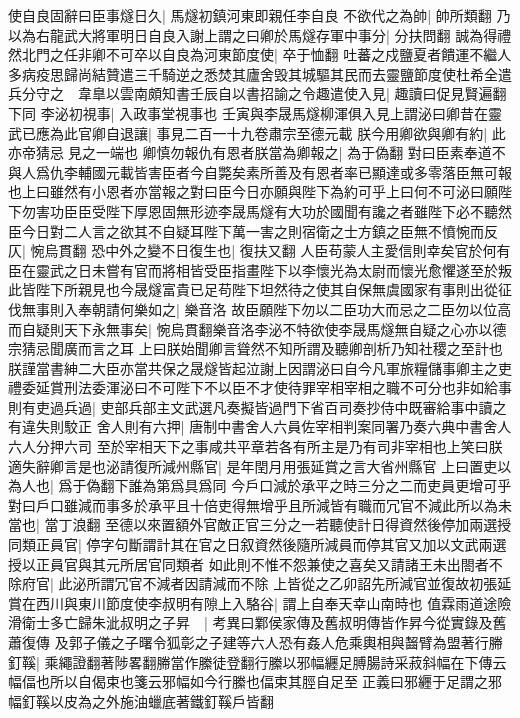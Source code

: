 使自良固辭曰臣事燧日久|{
	馬燧初鎮河東即親任李自良}
不欲代之為帥|{
	帥所類翻}
乃以為右龍武大將軍明日自良入謝上謂之曰卿於馬燧存軍中事分|{
	分扶問翻}
誠為得禮然北門之任非卿不可卒以自良為河東節度使|{
	卒于恤翻}
吐蕃之戍鹽夏者饋運不繼人多病疫思歸尚結贊遣三千騎逆之悉焚其廬舍毁其城驅其民而去靈鹽節度使杜希全遣兵分守之　韋臯以雲南頗知書壬辰自以書招諭之令趣遣使入見|{
	趣讀曰促見賢遍翻下同}
李泌初視事|{
	入政事堂視事也}
壬寅與李晟馬燧柳渾俱入見上謂泌曰卿昔在靈武已應為此官卿自退讓|{
	事見二百一十九卷肅宗至德元載}
朕今用卿欲與卿有約|{
	此亦帝猜忌見之一端也}
卿慎勿報仇有恩者朕當為卿報之|{
	為于偽翻}
對曰臣素奉道不與人爲仇李輔國元載皆害臣者今自斃矣素所善及有恩者率已顯達或多零落臣無可報也上曰雖然有小恩者亦當報之對曰臣今日亦願與陛下為約可乎上曰何不可泌曰願陛下勿害功臣臣受陛下厚恩固無形迹李晟馬燧有大功於國聞有讒之者雖陛下必不聽然臣今日對二人言之欲其不自疑耳陛下萬一害之則宿衛之士方鎮之臣無不憤惋而反仄|{
	惋烏貫翻}
恐中外之變不日復生也|{
	復扶又翻}
人臣苟蒙人主愛信則幸矣官於何有臣在靈武之日未嘗有官而將相皆受臣指畫陛下以李懷光為太尉而懷光愈懼遂至於叛此皆陛下所親見也今晟燧富貴已足苟陛下坦然待之使其自保無虞國家有事則出從征伐無事則入奉朝請何樂如之|{
	樂音洛}
故臣願陛下勿以二臣功大而忌之二臣勿以位高而自疑則天下永無事矣|{
	惋烏貫翻樂音洛李泌不特欲使李晟馬燧無自疑之心亦以德宗猜忌聞廣而言之耳}
上曰朕始聞卿言聳然不知所謂及聽卿剖析乃知社稷之至計也朕謹當書紳二大臣亦當共保之晟燧皆起泣謝上因謂泌曰自今凡軍旅糧儲事卿主之吏禮委延賞刑法委渾泌曰不可陛下不以臣不才使待罪宰相宰相之職不可分也非如給事則有吏過兵過|{
	吏部兵部主文武選凡奏擬皆過門下省百司奏抄侍中既審給事中讀之有違失則駮正}
舍人則有六押|{
	唐制中書舍人六員佐宰相判案同署乃奏六典中書舍人六人分押六司}
至於宰相天下之事咸共平章若各有所主是乃有司非宰相也上笑曰朕適失辭卿言是也泌請復所減州縣官|{
	是年閏月用張延賞之言大省州縣官}
上曰置吏以為人也|{
	爲于偽翻下誰為第爲具爲同}
今戶口減於承平之時三分之二而吏員更增可乎對曰戶口雖減而事多於承平且十倍吏得無增乎且所減皆有職而冗官不減此所以為未當也|{
	當丁浪翻}
至德以來置額外官敵正官三分之一若聽使計日得資然後停加兩選授同類正員官|{
	停字句斷謂計其在官之日叙資然後隨所減員而停其官又加以文武兩選授以正員官與其元所居官同類者}
如此則不惟不怨兼使之喜矣又請諸王未出閤者不除府官|{
	此泌所謂冗官不減者因請減而不除}
上皆從之乙卯詔先所減官並復故初張延賞在西川與東川節度使李叔明有隙上入駱谷|{
	謂上自奉天幸山南時也}
值霖雨道途險滑衛士多亡歸朱泚叔明之子昇　|{
	考異曰鄴侯家傳及舊叔明傳皆作昇今從實錄及舊蕭復傳}
及郭子儀之子曙令狐彰之子建等六人恐有姦人危乘輿相與齧臂為盟著行幐釘鞵|{
	乘繩證翻著陟畧翻幐當作縢徒登翻行縢以邪幅纒足膊腸詩采菽斜幅在下傳云幅偪也所以自偈束也箋云邪幅如今行縢也偪束其脛自足至正義曰邪纒于足謂之邪幅釘鞵以皮為之外施油蠟底著鐵釘鞵戶皆翻}
